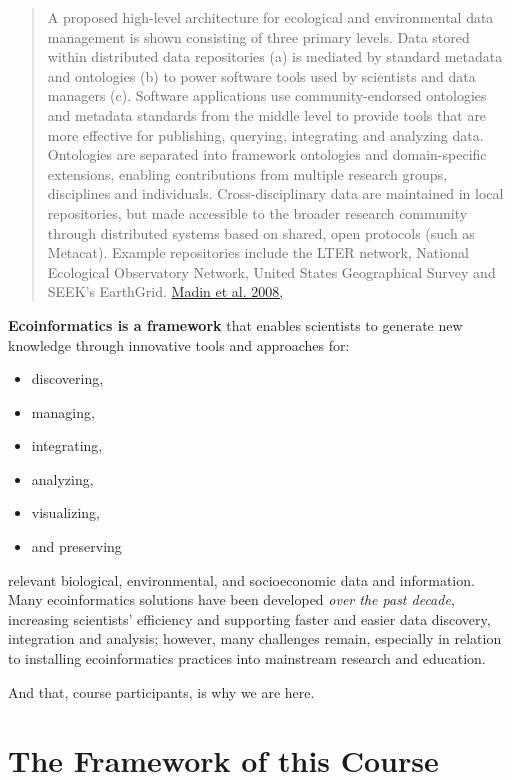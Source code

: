 \documentclass[
  letterpaper,
]{book}
\providecommand{\tightlist}{%
  \setlength{\itemsep}{0pt}\setlength{\parskip}{0pt}}
\begin{document}
\begin{quote}
A proposed high-level architecture for ecological and environmental data
management is shown consisting of three primary levels. Data stored
within distributed data repositories (a) is mediated by standard
metadata and ontologies (b) to power software tools used by scientists
and data managers (c). Software applications use community-endorsed
ontologies and metadata standards from the middle level to provide tools
that are more effective for publishing, querying, integrating and
analyzing data. Ontologies are separated into framework ontologies and
domain-specific extensions, enabling contributions from multiple
research groups, disciplines and individuals. Cross-disciplinary data
are maintained in local repositories, but made accessible to the broader
research community through distributed systems based on shared, open
protocols (such as Metacat). Example repositories include the LTER
network, National Ecological Observatory Network, United States
Geographical Survey and SEEK's EarthGrid.
\href{https://www.sciencedirect.com/science/article/pii/S0169534708000384?casa_token=b8GX-9jkuLwAAAAA:nQtJlhAUGyZdcokpQLEtho3OfVeDUKhENueO0k8H7dWPmPmXOUFYhGR6sKNtT04rEgJNR_HNlqg}{Madin
et al. 2008,}
\end{quote}

\textbf{Ecoinformatics is a framework} that enables scientists to
generate new knowledge through innovative tools and approaches for:

\begin{itemize}
\tightlist
\item
  discovering,
\item
  managing,
\item
  integrating,
\item
  analyzing,
\item
  visualizing,
\item
  and preserving
\end{itemize}

relevant biological, environmental, and socioeconomic data and
information. Many ecoinformatics solutions have been developed
\emph{over the past decade}, increasing scientists' efficiency and
supporting faster and easier data discovery, integration and analysis;
however, many challenges remain, especially in relation to installing
ecoinformatics practices into mainstream research and education.

And that, course participants, is why we are here.

\section*{The Framework of this
Course}\label{the-framework-of-this-course}
\end{document}

